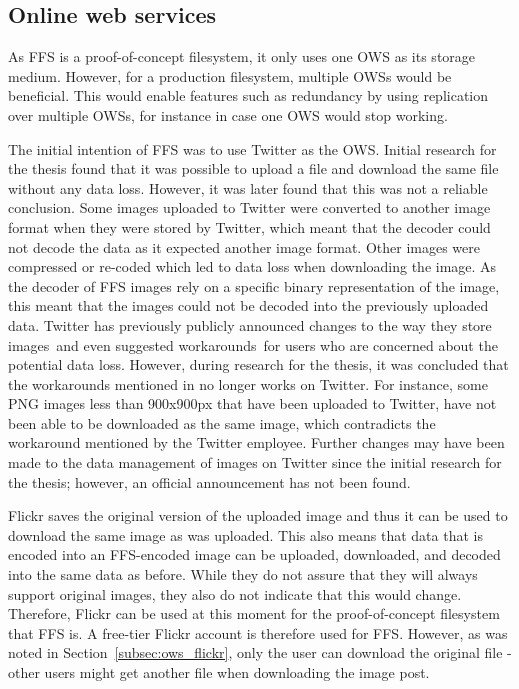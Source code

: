 \subsection{Online web services}
As \gls{FFS} is a \mbox{proof-of-concept} filesystem, it only uses one \gls{OWS} as its storage medium. However, for a production filesystem, multiple \gls{OWS}s would be beneficial. This would enable features such as redundancy by using replication over multiple \gls{OWS}s, for instance in case one \gls{OWS} would stop working.

The initial intention of \gls{FFS} was to use Twitter as the \gls{OWS}. Initial research for the thesis found that it was possible to upload a file and download the same file without any data loss. However, it was later found that this was not a reliable conclusion. Some images uploaded to Twitter were converted to another image format when they were stored by Twitter, which meant that the decoder could not decode the data as it expected another image format. Other images were compressed or \mbox{re-coded} which led to data loss when downloading the image. As the decoder of \gls{FFS} images rely on a specific binary representation of the image, this meant that the images could not be decoded into the previously uploaded data. Twitter has previously publicly announced changes to the way they store images\,\cite{nolanobrienUpcomingChangesPNG2018} and even suggested workarounds\,\cite{nolanobrienFeedbackUpcomingChanges2019} for users who are concerned about the potential data loss. However, during research for the thesis, it was concluded that the workarounds mentioned in \cite{nolanobrienFeedbackUpcomingChanges2019} no longer works on Twitter. For instance, some PNG images less than 900x900px that have been uploaded to Twitter, have not been able to be downloaded as the same image, which contradicts the workaround mentioned by the Twitter employee. Further changes may have been made to the data management of images on Twitter since the initial research for the thesis; however, an official announcement has not been found.

Flickr saves the original version of the uploaded image and thus it can be used to download the same image as was uploaded. This also means that data that is encoded into an \gls{FFS}-encoded image can be uploaded, downloaded, and decoded into the same data as before. While they do not assure that they will always support original images, they also do not indicate that this would change. Therefore, Flickr can be used at this moment for the \mbox{proof-of-concept} filesystem that \gls{FFS} is. A \mbox{free-tier} Flickr account is therefore used for \gls{FFS}. However, as was noted in Section~\ref{subsec:ows_flickr}, only the user can download the original file - other users might get another file when downloading the image post. 

